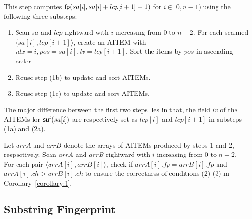 \documentclass[10pt,journal,compsoc]{IEEEtran}
\begin{document}
	\vspace{1ex}  This step computes ${\sf fp}(sa[i], sa[i] + lcp[i + 1] - 1)$ for $i \in [0, n - 1)$ using the following three substeps:
	
	\begin{enumerate}
		
		\item [(2a)]
		Scan $sa$ and $lcp$ rightward with $i$ increasing from $0$ to $n - 2$. For each scanned $\langle sa[i], lcp[i + 1] \rangle$, create an AITEM with $idx = i, pos = sa[i], lv = lcp[i + 1]$. Sort the items by $pos$ in ascending order.
		
		\item [(2b)]
		Reuse step (1b) to update and sort AITEMs.
		
		\item [(2c)]
		Reuse step (1c) to update and sort AITEMs.
		
	\end{enumerate}
	
	The major difference between the first two steps lies in that, the field $lv$ of the AITEMs for ${\sf suf}(sa[i])$ are respectively set as $lcp[i]$ and $lcp[i + 1]$ in substeps (1a) and (2a).
	
	
	\vspace{1ex}  Let $arrA$ and $arrB$ denote the arrays of AITEMs produced by steps 1 and 2, respectively. Scan $arrA$ and $arrB$ rightward with $i$ increasing from $0$ to $n - 2$. For each pair $\langle arrA[i], arrB[i]\rangle$, check if $arrA[i].fp = arrB[i].fp$ and $arrA[i].ch > arrB[i].ch$ to ensure the correctness of conditions (2)-(3) in Corollary~\ref{corollary:1}.
	
	\subsection{Substring Fingerprint} \label{sec:method1:fingerprint}
	
\end{document}
